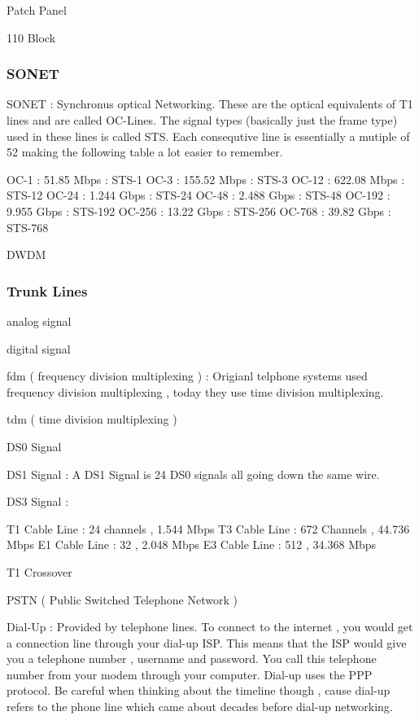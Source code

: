 Patch Panel

110 Block


\subsubsection{SONET}
\label{sssec:sonet}


SONET : Synchronus optical Networking. These are the optical equivalents of T1
lines and are called OC-Lines. The signal types (basically just the frame type)
used in these lines is called STS. Each consequtive line is essentially a
mutiple of 52 making the following table a lot easier to remember.

OC-1   : 51.85 Mbps  : STS-1
OC-3   : 155.52 Mbps : STS-3
OC-12  : 622.08 Mbps : STS-12
OC-24  : 1.244 Gbps  : STS-24
OC-48  : 2.488 Gbps  : STS-48
OC-192 : 9.955 Gbps  : STS-192
OC-256 : 13.22 Gbps  : STS-256
OC-768 : 39.82 Gbps  : STS-768

DWDM

\subsubsectionend

\subsubsection{Trunk Lines}
\label{sssec:trunk_lines}

analog signal

digital signal

fdm ( frequency division multiplexing ) : Origianl telphone systems used
frequency division multiplexing , today they use time division multiplexing.

tdm ( time division multiplexing )

DS0 Signal

DS1 Signal : A DS1 Signal is 24 DS0 signals all going down the same wire.

DS3 Signal :


T1 Cable Line : 24 channels , 1.544 Mbps
T3 Cable Line : 672 Channels , 44.736 Mbps
E1 Cable Line : 32 , 2.048 Mbps
E3 Cable Line : 512 , 34.368 Mbps

T1 Crossover

PSTN ( Public Switched Telephone Network )

Dial-Up : Provided by telephone lines. To connect to the internet , you would
get a connection line through your dial-up ISP. This means that the ISP would
give you a telephone number , username and password. You call this telephone
number from your modem through your computer. Dial-up uses the PPP protocol. Be
careful when thinking about the timeline though , cause dial-up refers to the
phone line which came about decades before dial-up networking.

